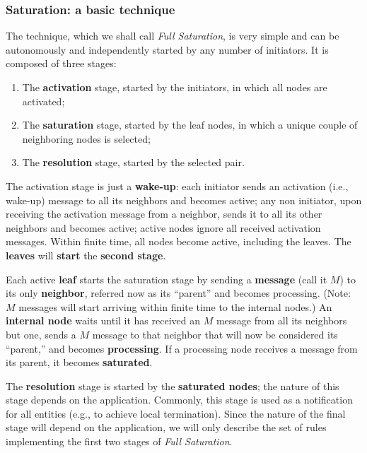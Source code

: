 \subsubsection{Saturation: a basic technique}
The technique, which we shall call \textit{Full Saturation}, is very simple and can be autonomously and independently started by any number of initiators. It is composed of three stages:
\begin{enumerate}
    \item The \textbf{activation} stage, started by the initiators, in which all nodes are activated; 
    \item The \textbf{saturation} stage, started by the leaf nodes, in which a unique couple of neighboring nodes is selected;
    \item The \textbf{resolution} stage, started by the selected pair.
\end{enumerate}
The activation stage is just a \textbf{wake-up}: each initiator sends an activation (i.e., wake-up) message to all its neighbors and becomes active; any non initiator, upon receiving the activation message from a neighbor, sends it to all its other neighbors and becomes active; active nodes ignore all received activation messages. Within finite time, all nodes become active, including the leaves. The \textbf{leaves} will \textbf{start} the \textbf{second stage}. 

Each active \textbf{leaf} starts the saturation stage by sending a \textbf{message} (call it $M$) to its only \textbf{neighbor}, referred now as its “parent” and becomes processing. (Note: $M$ messages will start arriving within finite time to the internal nodes.) An \textbf{internal node} waits until it has received an $M$ message from all its neighbors but one, sends a $M$ message to that neighbor that will now be considered its “parent,” and becomes \textbf{processing}. If a processing node receives a message from its parent, it becomes \textbf{saturated}. 

The \textbf{resolution} stage is started by the \textbf{saturated nodes}; the nature of this stage depends on the application. Commonly, this stage is used as a notification for all entities (e.g., to achieve local termination). Since the nature of the final stage will depend on the application, we will only describe the set of rules implementing the first two stages of \textit{Full Saturation}.


